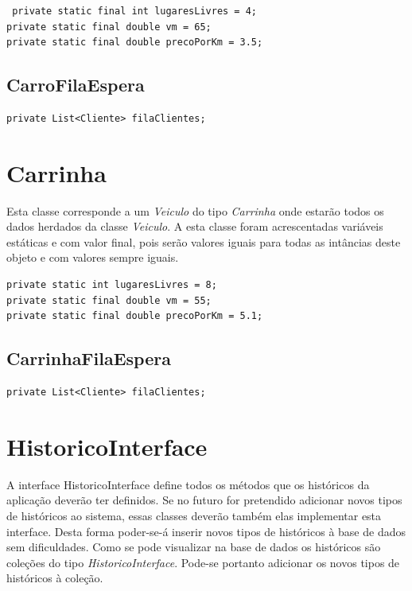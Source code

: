 \begin{verbatim}
 private static final int lugaresLivres = 4;
private static final double vm = 65; 
private static final double precoPorKm = 3.5;
\end{verbatim}

\subsection{CarroFilaEspera}
\begin{verbatim}
private List<Cliente> filaClientes;
\end{verbatim}

\section{Carrinha}

Esta classe corresponde a um \textit{Veiculo} do tipo \textit{Carrinha} onde estarão todos os dados herdados da classe \textit{Veiculo}. A esta classe foram acrescentadas variáveis estáticas e com valor final, pois serão valores iguais para todas as intâncias deste objeto e com valores sempre iguais. 

\begin{verbatim}
private static int lugaresLivres = 8;
private static final double vm = 55;
private static final double precoPorKm = 5.1;
\end{verbatim}

\subsection{CarrinhaFilaEspera}
\begin{verbatim}
private List<Cliente> filaClientes;
\end{verbatim}

\newpage
\section{HistoricoInterface}
A interface HistoricoInterface define todos os métodos que os históricos da aplicação deverão ter definidos. 
Se no futuro for pretendido adicionar novos tipos de históricos ao sistema, essas classes deverão também elas implementar esta interface.  Desta forma poder-se-á inserir novos tipos de históricos à base de dados sem dificuldades. Como se pode visualizar na base de dados os históricos são coleções do tipo \textit{HistoricoInterface}. Pode-se portanto adicionar os novos tipos de históricos à coleção. 

